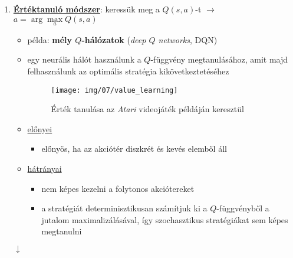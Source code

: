 \documentclass[a4paper, 11pt]{article}
\begin{document}
\begin{enumerate}
	\item \underline{\textbf{Értéktanuló módszer}}: keressük meg a $Q(s,a)$-t $\to$ $a = \arg \max\limits_a Q(s,a)$
	\begin{itemize}
		\item példa: \textbf{mély $Q$-hálózatok} (\textit{deep $Q$ networks}, DQN)
		\item egy neurális hálót használunk a $Q$-függvény megtanulásához, amit majd felhasználunk az optimális stratégia kikövetkeztetéséhez
		\begin{figure}[h!]
			\centering
			\texttt{[image: img/07/value\_learning]}
			\caption{Érték tanulása az \textit{Atari} videojáték példáján keresztül}
		\end{figure}
		\item \underline{előnyei}
		\begin{itemize}
			\item előnyös, ha az akciótér diszkrét és kevés elemből áll
		\end{itemize}
		\item \underline{hátrányai}
		\begin{itemize}
			\item nem képes kezelni a folytonos akciótereket
			\item a stratégiát determinisztikusan számítjuk ki a $Q$-függvényből a jutalom maximalizálásával, így szochasztikus stratégiákat sem képes megtanulni
		\end{itemize}
	\end{itemize}
	\begin{center}
		$\downarrow$
		

\end{center}
\end{enumerate}
\end{document}
